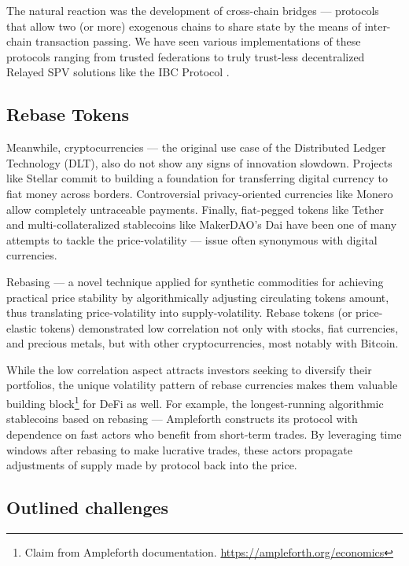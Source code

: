 \documentclass{article}
\begin{document}
The natural reaction was the development of cross-chain bridges --- protocols that allow two (or more) exogenous chains to share state by the means of inter-chain transaction passing. We have seen various implementations of these protocols ranging from trusted federations to truly trust-less decentralized Relayed SPV solutions like the IBC Protocol \cite{goes2020ibc}.

\subsection{Rebase Tokens}

Meanwhile, cryptocurrencies --- the original use case of the Distributed Ledger Technology (DLT), also do not show any signs of innovation slowdown. Projects like Stellar \cite{mazieres2016stellar} commit to building a foundation for transferring digital currency to fiat money across borders. Controversial privacy-oriented currencies like Monero \cite{saberhagen2013monero} allow completely untraceable payments. Finally, fiat-pegged tokens like Tether \cite{tether2016} and multi-collateralized stablecoins like MakerDAO's Dai \cite{makerdao2020dai} have been one of many attempts to tackle the price-volatility --- issue often synonymous with digital currencies.

Rebasing --- a novel technique applied for synthetic commodities for achieving practical price stability by algorithmically adjusting circulating tokens amount, thus translating price-volatility into supply-volatility. Rebase tokens (or price-elastic tokens) demonstrated low correlation not only with stocks, fiat currencies, and precious metals, but with other cryptocurrencies, most notably with Bitcoin.

While the low correlation aspect attracts investors seeking to diversify their portfolios, the unique volatility pattern of rebase currencies makes them valuable building block\footnote{Claim from Ampleforth documentation. \url{https://ampleforth.org/economics}} for DeFi as well. For example, the longest-running algorithmic stablecoins based on rebasing --- Ampleforth \cite{kuo2019ampleforth} constructs its protocol with dependence on fast actors who benefit from short-term trades. By leveraging time windows after rebasing to make lucrative trades, these actors propagate adjustments of supply made by protocol back into the price.

\subsection{Outlined challenges}
\end{document}
